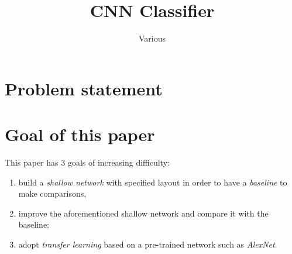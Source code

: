 \documentclass[a4paper, 11pt, twocolumn]{article} %
\begin{document}
\title{CNN Classifier}
\author{Various}
\maketitle
\tableofcontents %
\newpage
\clearpage

\section{Problem statement}

\section{Goal of this paper}

This paper has 3 goals of increasing difficulty:

\begin{enumerate}
    \item build a \emph{shallow network} with specified layout in order to have a \emph{baseline} to make comparisons,
    \item improve the aforementioned shallow network and compare it with the baseline;
    \item adopt \emph{transfer learning} based on a pre-trained network such as \emph{AlexNet}.
\end{enumerate}
\end{document}
